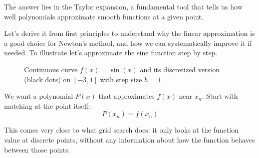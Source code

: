 The answer lies in the Taylor expansion, a fundamental tool that tells us how well 
polynomials approximate smooth functions at a given point.


Let's derive it from first principles to understand why the linear approximation is a good choice 
for Newton's method, 
and how we can systematically improve it if needed. 
To illustrate let's approximate the sine function step by step.

\begin{figure}[h]
    \centering
    \caption{Continuous curve $f(x) = \sin(x)$ and its discretized version (black dots) on $[-3,1]$ with step size $h=1$.}
    \label{fig:sine}
\end{figure}


We want a polynomial $P(x)$ that approximates $f(x)$ near $x_n$. Start with matching at the point itself:
\begin{equation}
    P(x_n) = f(x_n)
\end{equation}

This comes very close to what grid search does: it only looks at the function value at discrete points, without any information about how the function behaves between those points.

